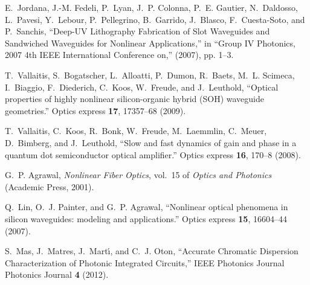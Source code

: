 \documentclass[10pt,letterpaper]{article}
\begin{document}
\begin{thebibliography}{10}
E.~Jordana, J.-M. Fedeli, P.~Lyan, J.~P. Colonna, P.~E. Gautier, N.~Daldosso,
  L.~Pavesi, Y.~Lebour, P.~Pellegrino, B.~Garrido, J.~Blasco, F.~Cuesta-Soto,
  and P.~Sanchis, \enquote{{Deep-UV Lithography Fabrication of Slot Waveguides
  and Sandwiched Waveguides for Nonlinear Applications},} in \enquote{Group IV
  Photonics, 2007 4th IEEE International Conference on,}  (2007), pp. 1--3.

T.~Vallaitis, S.~Bogatscher, L.~Alloatti, P.~Dumon, R.~Baets, M.~L. Scimeca,
  I.~Biaggio, F.~Diederich, C.~Koos, W.~Freude, and J.~Leuthold,
  \enquote{{Optical properties of highly nonlinear silicon-organic hybrid (SOH)
  waveguide geometries.}} Optics express \textbf{17}, 17357--68 (2009).

T.~Vallaitis, C.~Koos, R.~Bonk, W.~Freude, M.~Laemmlin, C.~Meuer, D.~Bimberg,
  and J.~Leuthold, \enquote{{Slow and fast dynamics of gain and phase in a
  quantum dot semiconductor optical amplifier.}} Optics express \textbf{16},
  170--8 (2008).

G.~P. Agrawal, \emph{{Nonlinear Fiber Optics}}, vol.~15 of \emph{Optics and
  Photonics} (Academic Press, 2001).

Q.~Lin, O.~J. Painter, and G.~P. Agrawal, \enquote{{Nonlinear optical phenomena
  in silicon waveguides: modeling and applications.}} Optics express
  \textbf{15}, 16604--44 (2007).

S.~Mas, J.~Matres, J.~Mart\'{\i}, and C.~J. Oton, \enquote{{Accurate Chromatic
  Dispersion Characterization of Photonic Integrated Circuits},} IEEE Photonics
  Journal Photonics Journal \textbf{4} (2012).

\end{thebibliography}
\end{document}
